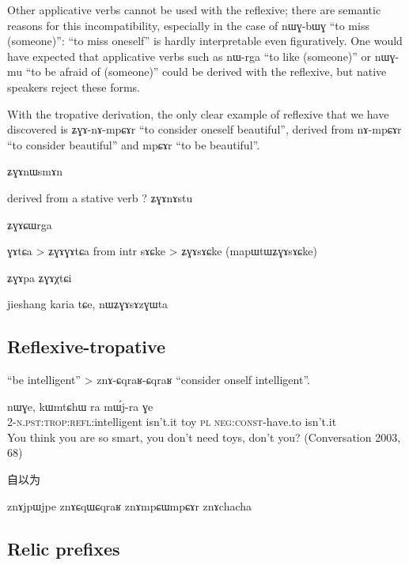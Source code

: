 \documentclass[oldfontcommands,oneside,a4paper,11pt]{memoir}
\newcommand{\ipa}[1]{{\phon #1}} %
\newcommand{\wav}[1]{}%
\newcommand{\const}{\textsc{const}}
\newcommand{\negat}{\textsc{neg}}
\newcommand{\npst}{\textsc{n.pst}}
\newcommand{\pl}{\textsc{pl}}
\newcommand{\refl}{\textsc{refl}}
\newcommand{\trop}{\textsc{trop}}
\begin{document}
Other applicative verbs cannot be used with the reflexive; there are semantic reasons for this incompatibility, especially in the case of \ipa{nɯɣ-bɯɣ} ``to miss (someone)'': ``to miss oneself'' is hardly interpretable even figuratively. One would have expected that applicative verbs such as \ipa{nɯ-rga} ``to like (someone)'' or \ipa{nɯɣ-mu} ``to be afraid of (someone)'' could be derived with the reflexive, but native speakers reject these forms.

With the tropative derivation, the only clear example of reflexive that we have discovered is \ipa{ʑɣɤ-nɤ-mpɕɤr} ``to consider oneself beautiful'', derived from \ipa{nɤ-mpɕɤr} ``to consider beautiful'' and \ipa{mpɕɤr} ``to be beautiful''.



 ʑɣɤnɯsmɤn

derived from a stative verb ?
ʑɣɤnɤstu 





ʑɣɤɕɯrga

ɣɤtɕa > ʑɣɤɣɤtɕa
from intr
sɤɕke > ʑɣɤsɤɕke (mapɯtɯʑɣɤsɤɕke)



ʑɣɤpa
ʑɣɤχtɕi

jieshang karia tɕe, nɯʑɣɤsɤzɣɯta
\wav{ZGAsAzGWt}

 


\subsection{Reflexive-tropative} \label{sub:refl.trop}


   \begin{exe}
\ex
 \glt   \ipa{ɕqraʁ} ``be intelligent'' > \ipa{znɤ-ɕqraʁ-ɕqraʁ} ``consider onself intelligent''.
\end{exe} 
 
   \begin{exe}
\ex
\gll \ipa{tɯ-znɤɕqraʁɕqraʁ} 	\ipa{nɯɣe,} 	\ipa{kɯmtɕhɯ} 	\ipa{ra} 	\ipa{mɯ́j-ra} 	\ipa{ɣe}  \\
 2-\npst{}:\trop{}:\refl{}:intelligent isn't.it toy \pl{} \negat{}:\const{}-have.to isn't.it \\
  \glt   You think you are so smart, you don't need toys, don't you? (Conversation 2003, 68)
   \end{exe}
自以为

znɤjpɯjpe
znɤɕqɯɕqraʁ
znɤmpɕɯmpɕɤr
znɤchacha



\subsection{Relic prefixes} \label{sub:relic.val.decrease}
\end{document}
